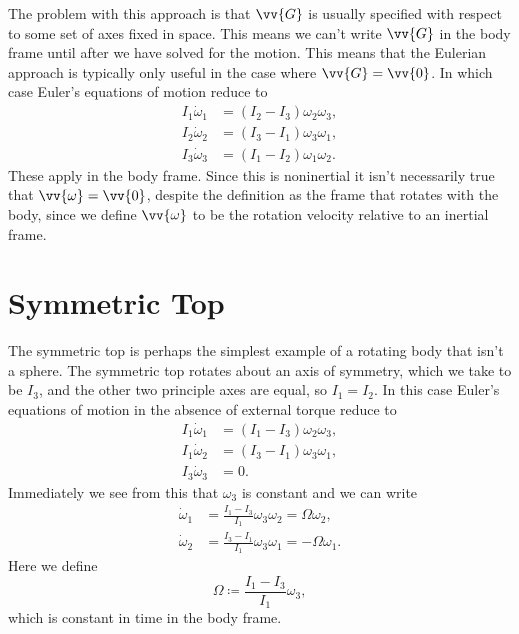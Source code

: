 \documentclass[fleqn]{NotesClass}
\begin{document}
    The problem with this approach is that \(\vv{G}\) is usually specified with respect to some set of axes fixed in space.
    This means we can't write \(\vv{G}\) in the body frame until after we have solved for the motion.
    This means that the Eulerian approach is typically only useful in the case where \(\vv{G} = \vv{0}\).
    In which case Euler's equations of motion reduce to
    \begin{align}
        I_1\dot{\omega}_1 &= (I_2 - I_3)\omega_2\omega_3,\\
        I_2\dot{\omega}_2 &= (I_3 - I_1)\omega_3\omega_1,\\
        I_3\dot{\omega}_3 &= (I_1 - I_2)\omega_1\omega_2.
    \end{align}
    These apply in the body frame.
    Since this is noninertial it isn't necessarily true that \(\vv{\omega} = \vv{0}\), despite the definition as the frame that rotates with the body, since we define \(\vv{\omega}\) to be the rotation velocity relative to an inertial frame.
    
    \section{Symmetric Top}
    The symmetric top is perhaps the simplest example of a rotating body that isn't a sphere.
    The symmetric top rotates about an axis of symmetry, which we take to be \(I_3\), and the other two principle axes are equal, so \(I_1 = I_2\).
    In this case Euler's equations of motion in the absence of external torque reduce to
    \begin{align}
        I_1\dot{\omega}_1 &= (I_1 - I_3)\omega_2\omega_3,\\
        I_1\dot{\omega}_2 &= (I_3 - I_1)\omega_3\omega_1,\\
        I_3\dot{\omega}_3 &= 0.
    \end{align}
    Immediately we see from this that \(\omega_3\) is constant and we can write
    \begin{align}
        \dot{\omega}_1 &= \frac{I_1 - I_3}{I_1}\omega_3\omega_2 = \Omega\omega_2,\\
        \dot{\omega}_2 &= \frac{I_3 - I_1}{I_1}\omega_3\omega_1 = -\Omega\omega_1.
    \end{align}
    Here we define
    \begin{equation}
        \Omega \coloneqq \frac{I_1 - I_3}{I_1}\omega_3,
    \end{equation}
    which is constant in time in the body frame.
    
\end{document}
